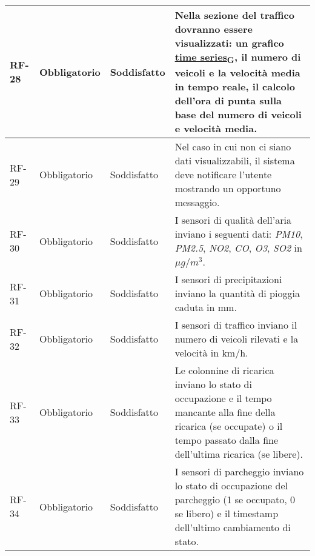 \begin{longtable}{|>{\centering\arraybackslash}m{}|>{\centering\arraybackslash}m{}|>{\centering\arraybackslash}m{}|>{\centering\arraybackslash}m{}|}
	\\\hline
	RF-28           & Obbligatorio        & Soddisfatto                                                                                                           & Nella sezione del traffico dovranno essere visualizzati: un grafico \href{https://7last.github.io/docs/pb/documentazione-interna/glossario\#time-series}{time series\textsubscript{G}}, il numero di veicoli e la velocità media in tempo reale, il calcolo dell'ora di punta sulla base del numero di veicoli e velocità media.
	\\\hline
	RF-29           & Obbligatorio        & Soddisfatto                                                                                                           & Nel caso in cui non ci siano dati visualizzabili, il sistema deve notificare l'utente mostrando un opportuno messaggio.
	\\\hline
	RF-30           & Obbligatorio        & Soddisfatto                                                                                                           & I sensori di qualità dell'aria inviano i seguenti dati: \textit{PM10}, \textit{PM2.5}, \textit{NO2}, \textit{CO}, \textit{O3}, \textit{SO2} in $\mu g/m^3$.
	\\\hline
	RF-31           & Obbligatorio        & Soddisfatto                                                                                                           & I sensori di precipitazioni inviano la quantità di pioggia caduta in mm.
	\\\hline
	RF-32           & Obbligatorio        & Soddisfatto                                                                                                           & I sensori di traffico inviano il numero di veicoli rilevati e la velocità in km/h.
	\\\hline
	RF-33           & Obbligatorio        & Soddisfatto                                                                                                           & Le colonnine di ricarica inviano lo stato di occupazione e il tempo mancante alla fine della ricarica (se occupate) o il tempo passato dalla fine dell'ultima ricarica (se libere).
	\\\hline
	RF-34           & Obbligatorio        & Soddisfatto                                                                                                           & I sensori di parcheggio inviano lo stato di occupazione del parcheggio (1 se occupato, 0 se libero) e il timestamp dell'ultimo cambiamento di stato.
	\\\hline

\end{longtable}
